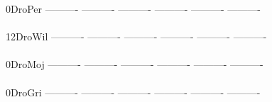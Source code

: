 \documentclass[11pt,twoside,reqno,a4paper]{article}
\begin{document}
{0\hspace*{4\charwidth}DroPer	----------	----------	----------	----------	----------	----------	\\
\hspace*{5\charwidth}\hspace*{7\charwidth}\hspace*{1\charwidth}\hspace*{1\charwidth}\hspace*{1\charwidth}\hspace*{1\charwidth}\hspace*{1\charwidth}\hspace*{1\charwidth}\\
12\hspace*{3\charwidth}DroWil	----------	----------	----------	----------	----------	----------	\\
\hspace*{5\charwidth}\hspace*{7\charwidth}\hspace*{1\charwidth}\hspace*{1\charwidth}\hspace*{1\charwidth}\hspace*{1\charwidth}\hspace*{1\charwidth}\hspace*{1\charwidth}\\
0\hspace*{4\charwidth}DroMoj	----------	----------	----------	----------	----------	----------	\\
\hspace*{5\charwidth}\hspace*{7\charwidth}\hspace*{1\charwidth}\hspace*{1\charwidth}\hspace*{1\charwidth}\hspace*{1\charwidth}\hspace*{1\charwidth}\hspace*{1\charwidth}\\
0\hspace*{4\charwidth}DroGri	----------	----------	----------	----------	----------	----------	\\
\hspace*{5\charwidth}\hspace*{7\charwidth}\hspace*{1\charwidth}\hspace*{1\charwidth}\hspace*{1\charwidth}\hspace*{1\charwidth}\hspace*{1\charwidth}\hspace*{1\charwidth}\\
}
\end{document}
